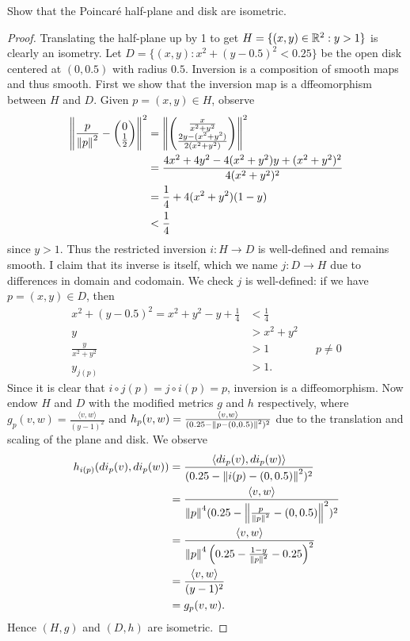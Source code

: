 \documentclass[12pt]{article}
\begin{document}
\begin{problem}[LN12 0.2.3]
Show that the Poincar\'e half-plane and disk are isometric.
\end{problem}
\begin{proof}
Translating the half-plane up by 1 to get $ H = \{(x,y) \in \mathbb{R}^2:y >1\} $ is clearly an isometry. Let $ D = \{(x,y): x^2+(y-0.5)^2 < 0.25 \} $ be the open disk centered at $ (0,0.5)$ with radius  $ 0.5$. Inversion is a composition of smooth maps and thus smooth. First we show that the inversion map is a dffeomorphism between $ H$ and $ D$. Given  $ p=(x,y) \in H$, observe
\begin{align*}
	{\left\lVert{ \frac{p}{{\left\lVert{ p}\right\rVert}^2 } - \begin{pmatrix} 0\\ \frac{1}{2} \end{pmatrix} }\right\rVert}^2 &= {\left\lVert{ \begin{pmatrix} \frac{x}{x^2+y^2} \\ \frac{2y - (x^2+y^2)}{ 2(x^2+y^2)} \end{pmatrix} }\right\rVert} ^2 \\ 
	&= \frac{4x^2 + 4y^2 -4(x^2+y^2)y +(x^2+y^2)^2}{ 4(x^2+y^2)^2 } \\
	&= \frac{1}{4} + 4(x^2+y^2)(1-y) \\
	&< \frac{1}{4}  
\end{align*}
since $ y>1$. Thus the restricted inversion $ i: H \to D$ is well-defined and remains smooth. I claim that its inverse is itself, which we name $ j:D \to H$ due to differences in domain and codomain. We check $ j$ is well-defined: if we have $ p=(x,y) \in D$, then
\begin{align*}
	x^2 + (y-0.5)^2 = x^2+y^2-y + \frac{1}{4} &< \frac{1}{4}\\
	y &> x^2 + y^2\\
	\frac{y}{x^2+y^2} &> 1 && p \neq 0\\
	y_{j(p)} & >1.
\end{align*}
Since it is clear that $ i \circ j(p) = j \circ i (p) = p $, inversion is a diffeomorphism. Now endow $ H$ and $ D$ with the modified metrics $ g$ and $ h$ respectively, where $ g_p(v,w) = \frac{\langle v,w \rangle}{ (y-1)^2}$ and $ h_p(v,w) = \frac{\langle v,w \rangle}{ (0.25 - {\left\lVert{ p-(0,0.5)}\right\rVert}^2 )^2}$ due to the translation and scaling of the plane and disk. We observe
\begin{align*}
	h_{i(p)}(di_p(v),di_p(w)) &= \frac{\langle di_p(v),di_p(w) \rangle}{ (0.25-{\left\lVert{i(p) - (0,0.5)}\right\rVert}^2)^2} \\
	&= \frac{\langle v,w \rangle}{ {\left\lVert{ p}\right\rVert}^{4} (0.25-{\left\lVert{ \frac{p}{{\left\lVert{ p}\right\rVert}^2 } - (0,0.5)}\right\rVert}^2 )^2 } \\
&= \frac{\langle v,w \rangle}{ {\left\lVert{ p}\right\rVert}^{4} \left( 0.25- \frac{1-y}{{\left\lVert{ p}\right\rVert}^2} -0.25 \right) ^2 } \\
	&= \frac{\langle v,w \rangle}{ (y-1)^2} \\
	&= g_p(v,w) .
\end{align*}
Hence $ (H,g)$ and  $ (D,h)$ are isometric.
\end{proof}
\end{document}

